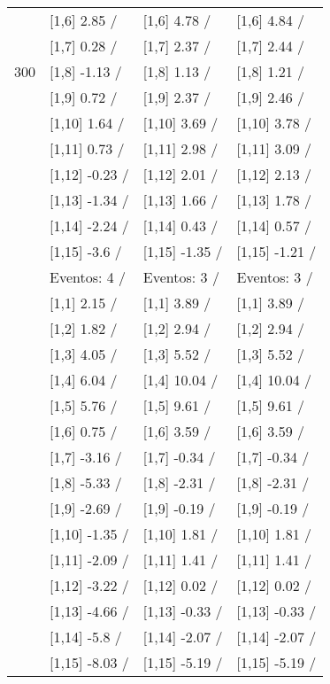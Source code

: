 \begin{table}
\begin{tabular}[t]{llll}
 & {}[1,6] 2.85  / & {}[1,6] 4.78  / & {}[1,6] 4.84  /\\
 & {}[1,7] 0.28  / & {}[1,7] 2.37  / & {}[1,7] 2.44  /\\
300 & {}[1,8] -1.13  / & {}[1,8] 1.13  / & {}[1,8] 1.21  /\\
\addlinespace
 & {}[1,9] 0.72  / & {}[1,9] 2.37  / & {}[1,9] 2.46  /\\
 & {}[1,10] 1.64  / & {}[1,10] 3.69  / & {}[1,10] 3.78  /\\
 & {}[1,11] 0.73  / & {}[1,11] 2.98  / & {}[1,11] 3.09  /\\
 & {}[1,12] -0.23  / & {}[1,12] 2.01  / & {}[1,12] 2.13  /\\
 & {}[1,13] -1.34  / & {}[1,13] 1.66  / & {}[1,13] 1.78  /\\
\addlinespace
 & {}[1,14] -2.24  / & {}[1,14] 0.43  / & {}[1,14] 0.57  /\\
 & {}[1,15] -3.6  / & {}[1,15] -1.35  / & {}[1,15] -1.21  /\\
 & Eventos:  4 / & Eventos:  3 / & Eventos:  3 /\\
 & {}[1,1] 2.15  / & {}[1,1] 3.89  / & {}[1,1] 3.89  /\\
 & {}[1,2] 1.82  / & {}[1,2] 2.94  / & {}[1,2] 2.94  /\\
\addlinespace
 & {}[1,3] 4.05  / & {}[1,3] 5.52  / & {}[1,3] 5.52  /\\
 & {}[1,4] 6.04  / & {}[1,4] 10.04  / & {}[1,4] 10.04  /\\
 & {}[1,5] 5.76  / & {}[1,5] 9.61  / & {}[1,5] 9.61  /\\
 & {}[1,6] 0.75  / & {}[1,6] 3.59  / & {}[1,6] 3.59  /\\
 & {}[1,7] -3.16  / & {}[1,7] -0.34  / & {}[1,7] -0.34  /\\
\addlinespace
500 & {}[1,8] -5.33  / & {}[1,8] -2.31  / & {}[1,8] -2.31  /\\
 & {}[1,9] -2.69  / & {}[1,9] -0.19  / & {}[1,9] -0.19  /\\
 & {}[1,10] -1.35  / & {}[1,10] 1.81  / & {}[1,10] 1.81  /\\
 & {}[1,11] -2.09  / & {}[1,11] 1.41  / & {}[1,11] 1.41  /\\
 & {}[1,12] -3.22  / & {}[1,12] 0.02  / & {}[1,12] 0.02  /\\
\addlinespace
 & {}[1,13] -4.66  / & {}[1,13] -0.33  / & {}[1,13] -0.33  /\\
 & {}[1,14] -5.8  / & {}[1,14] -2.07  / & {}[1,14] -2.07  /\\
 & {}[1,15] -8.03  / & {}[1,15] -5.19  / & {}[1,15] -5.19  /\\
\bottomrule
\end{tabular}
\end{table}
